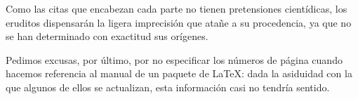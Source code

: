 Como las citas que encabezan cada parte no tienen pretensiones cientídicas, los eruditos dispensarán la ligera imprecisión que atañe a su procedencia, ya que no se han determinado con exactitud sus orígenes.

Pedimos excusas, por último, por no especificar los números de página cuando hacemos referencia al manual de un paquete de \LaTeX{}: dada la asiduidad con la que algunos de ellos se actualizan, esta información casi no tendría sentido.
